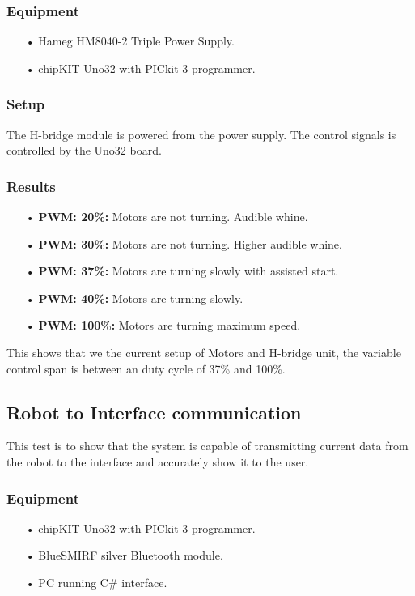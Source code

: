 \subsubsection{Equipment}
\begin{enumerate}
	\item[•]Hameg HM8040-2 Triple Power Supply.
	\item[•]chipKIT Uno32 with PICkit 3 programmer.
\end{enumerate}

\subsubsection{Setup}
	The H-bridge module is powered from the power supply.
	The control signals is controlled by the Uno32 board.

\subsubsection{Results}
\begin{enumerate}
	\item[•]\textbf{PWM: 20\%:} Motors are not turning. Audible whine.
	\item[•]\textbf{PWM: 30\%:} Motors are not turning. Higher audible whine.
	\item[•]\textbf{PWM: 37\%:} Motors are turning slowly with assisted start.
	\item[•]\textbf{PWM: 40\%:} Motors are turning slowly.
	\item[•]\textbf{PWM: 100\%:} Motors are turning maximum speed.
\end{enumerate}
This shows that we the current setup of Motors and H-bridge unit, the variable control span is between an duty cycle of 37\% and 100\%.

\subsection{Robot to Interface communication}
This test is to show that the system is capable of transmitting current data from the robot to the interface and accurately show it to the user.

\subsubsection{Equipment}
\begin{enumerate}
	\item[•]chipKIT Uno32 with PICkit 3 programmer.
	\item[•]BlueSMIRF silver Bluetooth module.
	\item[•]PC running C\# interface.
\end{enumerate}

